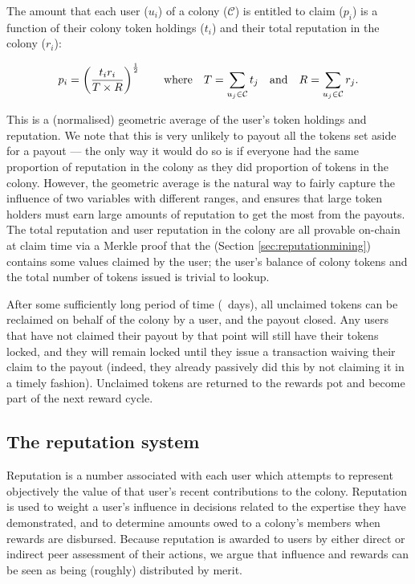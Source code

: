 The amount that each user ($u_i$) of a colony ($\mathcal{C}$) is entitled to claim ($p_i$) is a function of their colony token holdings ($t_i$) and their total reputation in the colony ($r_i$):

\begin{equation}\label{eq:reward-claim}
 p_i = \left(\frac{t_i r_i}{T \times R}\right)^{\frac{1}{2}} \qquad \textnormal{where} \quad T = \sum\limits_{u_j\in \mathcal{C}} t_j \quad\textnormal{and}\quad R = \sum\limits_{u_j\in \mathcal{C}} r_j.
\end{equation}

This is a (normalised) geometric average of the user's token holdings and reputation. We note that this is very unlikely to payout all the tokens set aside for a payout --- the only way it would do so is if everyone had the same proportion of reputation in the colony as they did proportion of tokens in the colony. However, the geometric average is the natural way to fairly capture the influence of two variables with different ranges, and ensures that large token holders must earn large amounts of reputation to get the most from the payouts. The total reputation and user reputation in the colony are all provable on-chain at claim time via a Merkle proof that the  (Section \ref{sec:reputationmining}) contains some values claimed by the user; the user's balance of colony tokens and the total number of tokens issued is trivial to lookup.

After some sufficiently long period of time (\rewardclaimduration\ days), all unclaimed tokens can be reclaimed on behalf of the colony by a user, and the payout closed. Any users that have not claimed their payout by that point will still have their tokens locked, and they will remain locked until they issue a transaction waiving their claim to the payout (indeed, they already passively did this by not claiming it in a timely fashion). Unclaimed tokens are returned to the rewards pot and become part of the next reward cycle.

\subsection{The reputation system}\label{sec:reputation}

Reputation is a number associated with each user which attempts to represent objectively the value of that user's recent contributions to the colony. Reputation is used to weight a user's influence in decisions related to the expertise they have demonstrated, and to determine amounts owed to a colony's members when rewards are disbursed. Because reputation is awarded to users by either direct or indirect peer assessment of their actions, we argue that influence and rewards can be seen as being (roughly) distributed by merit.

